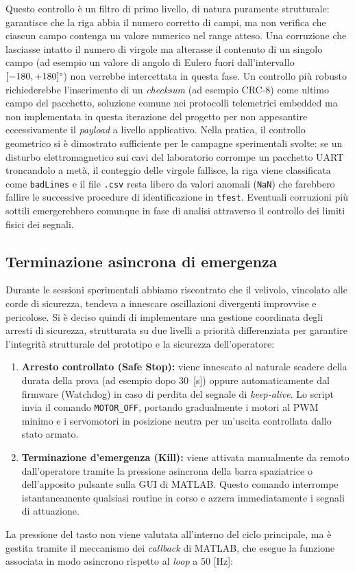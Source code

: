 \documentclass[11pt]{report}
\begin{document}
	Questo controllo è un filtro di primo livello, di natura puramente strutturale: garantisce che la riga abbia il numero corretto di campi, ma non verifica che ciascun campo contenga un valore numerico nel range atteso. Una corruzione che lasciasse intatto il numero di virgole ma alterasse il contenuto di un singolo campo (ad esempio un valore di angolo di Eulero fuori dall'intervallo $[-180, +180]\degree$) non verrebbe intercettata in questa fase. Un controllo più robusto richiederebbe l'inserimento di un \textit{checksum} (ad esempio CRC-8) come ultimo campo del pacchetto, soluzione comune nei protocolli telemetrici embedded ma non implementata in questa iterazione del progetto per non appesantire eccessivamente il \textit{payload} a livello applicativo. Nella pratica, il controllo geometrico si è dimostrato sufficiente per le campagne sperimentali svolte: se un disturbo elettromagnetico sui cavi del laboratorio corrompe un pacchetto UART troncandolo a metà, il conteggio delle virgole fallisce, la riga viene classificata come \texttt{badLines} e il file \texttt{.csv} resta libero da valori anomali (\texttt{NaN}) che farebbero fallire le successive procedure di identificazione in \texttt{tfest}. Eventuali corruzioni più sottili emergerebbero comunque in fase di analisi attraverso il controllo dei limiti fisici dei segnali.
	
	\subsection{Terminazione asincrona di emergenza}
Durante le sessioni sperimentali abbiamo riscontrato che il velivolo, vincolato alle corde di sicurezza, tendeva a innescare oscillazioni divergenti improvvise e pericolose. Si è deciso quindi di implementare una gestione coordinata degli arresti di sicurezza, strutturata su due livelli a priorità differenziata per garantire l’integrità strutturale del prototipo e la sicurezza dell'operatore:
\begin{enumerate}
    \item \textbf{Arresto controllato (Safe Stop):} viene innescato al naturale scadere della durata della prova (ad esempio dopo 30~[s]) oppure automaticamente dal firmware (Watchdog) in caso di perdita del segnale di \textit{keep-alive}. Lo script invia il comando \texttt{MOTOR\_OFF}, portando gradualmente i motori al PWM minimo e i servomotori in posizione neutra per un'uscita controllata dallo stato armato.
    \item \textbf{Terminazione d'emergenza (Kill):} viene attivata manualmente da remoto dall'operatore tramite la pressione asincrona della barra spaziatrice o dell'apposito pulsante sulla GUI di MATLAB\@. Questo comando interrompe istantaneamente qualsiasi routine in corso e azzera immediatamente i segnali di attuazione.
\end{enumerate}
	La pressione del tasto non viene valutata all'interno del ciclo principale, ma è gestita tramite il meccanismo dei \textit{callback} di MATLAB, che esegue la funzione associata in modo asincrono rispetto al \textit{loop} a 50 [Hz]:
	
\end{document}
